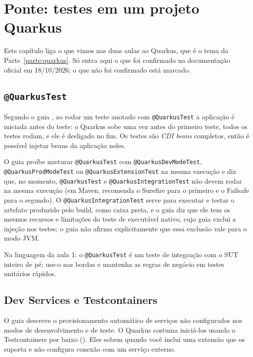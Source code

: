 \chapter{Ponte: testes em um projeto Quarkus}
\label{cap:ponte-quarkus}

Este capítulo liga o que vimos nas duas aulas ao Quarkus, que é o tema da
Parte~\ref{parte:quarkus}. Só entra aqui o que foi confirmado na documentação oficial em
18/10/2026; o que não foi confirmado está marcado.

\section{\texttt{@QuarkusTest}}

Segundo o guia , ao rodar um teste anotado
com \texttt{@QuarkusTest} a aplicação é iniciada antes do teste: o Quarkus
sobe uma vez antes do primeiro teste, todos os testes rodam, e ele é
desligado no fim. Os testes são \emph{CDI beans} completos, então é
possível injetar beans da aplicação neles.

\begin{sloppypar}
O guia proíbe misturar \texttt{@QuarkusTest} com
\texttt{@Quarkus\-DevModeTest}, \texttt{@Quarkus\-ProdModeTest} ou
\texttt{@Quarkus\-Extension\-Test} na mesma execução e diz que, no momento,
\texttt{@QuarkusTest} e \texttt{@Quarkus\-Integration\-Test} não devem rodar na
mesma execução (em Maven, recomenda o Surefire para o primeiro e o Failsafe
para o segundo). O \texttt{@Quarkus\-Integration\-Test} serve para executar e
testar o artefato produzido pelo build, como caixa preta, e o guia diz que
ele tem os mesmos recursos e limitações do teste de executável nativo, cujo
guia exclui a injeção nos testes; o guia não afirma explicitamente que essa
exclusão vale para o modo JVM.
\end{sloppypar}

Na linguagem da aula 1: o \texttt{@QuarkusTest} é um teste de integração
com o SUT inteiro de pé; use-o nas bordas e mantenha as regras de negócio
em testes unitários rápidos.

\section{Dev Services e Testcontainers}

O guia  descreve o provisionamento
automático de serviços não configurados nos modos de desenvolvimento e de
teste. O Quarkus costuma iniciá-los usando o Testcontainers por baixo
(). Eles sobem quando você inclui uma
extensão que os suporta e não configura conexão com um serviço externo.

